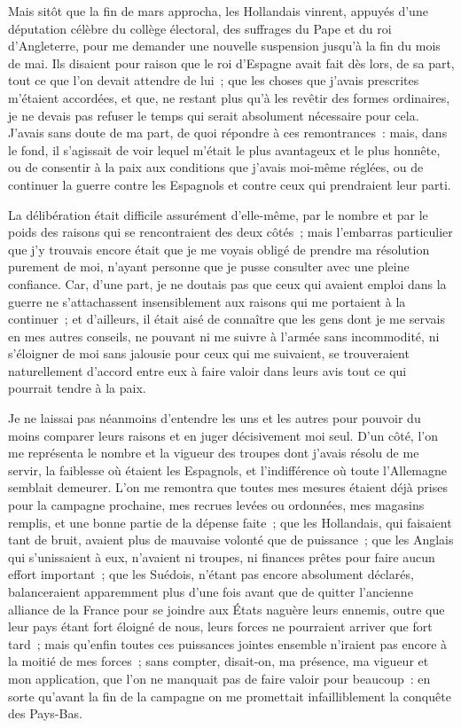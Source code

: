 \documentclass[french,twoside]{book} %
\begin{document}
Mais sitôt que la fin de mars approcha, les Hollandais vinrent, appuyés d’une députation célèbre du collège électoral, des suffrages du Pape et du roi d’Angleterre, pour me demander une nouvelle suspension jusqu’à la fin du mois de mai. Ils disaient pour raison que le roi d’Espagne avait fait dès lors, de sa part, tout ce que l’on devait attendre de lui ; que les choses que j’avais prescrites m’étaient accordées, et que, ne restant plus qu’à les revêtir des formes ordinaires, je ne devais pas refuser le temps qui serait absolument nécessaire pour cela. J’avais sans doute de ma part, de quoi répondre à ces remontrances : mais, dans le fond, il s’agissait de voir lequel m’était le plus avantageux et le plus honnête, ou de consentir à la paix aux conditions que j’avais moi-même réglées, ou de continuer la guerre contre les Espagnols et contre ceux qui prendraient leur parti.\par
La délibération était difficile assurément d’elle-même, par le nombre et par le poids des raisons qui se rencontraient des deux côtés ; mais l’embarras particulier que j’y trouvais encore était que je me voyais obligé de prendre ma résolution purement de moi, n’ayant personne que je pusse consulter avec une pleine confiance. Car, d’une part, je ne doutais pas que ceux qui avaient emploi dans la guerre ne s’attachassent insensiblement aux raisons qui me portaient à la continuer ; et d’ailleurs, il était aisé de connaître que les gens dont je me servais en mes autres conseils, ne pouvant ni me suivre à l’armée sans incommodité, ni s’éloigner de moi sans jalousie pour ceux qui me suivaient, se trouveraient naturellement d’accord entre eux à faire valoir dans leurs avis tout ce qui pourrait tendre à la paix.\par
Je ne laissai pas néanmoins d’entendre les uns et les autres pour pouvoir du moins comparer leurs raisons et en juger décisivement moi seul. D’un côté, l’on me représenta le nombre et la vigueur des troupes dont j’avais résolu de me servir, la faiblesse où étaient les Espagnols, et l’indifférence où toute l’Allemagne semblait demeurer. L’on me remontra que toutes mes mesures étaient déjà prises pour la campagne prochaine, mes recrues levées ou ordonnées, mes magasins remplis, et une bonne partie de la dépense faite ; que les Hollandais, qui faisaient tant de bruit, avaient plus de mauvaise volonté que de puissance ; que les Anglais qui s’unissaient à eux, n’avaient ni troupes, ni finances prêtes pour faire aucun effort important ; que les Suédois, n’étant pas encore absolument déclarés, balanceraient apparemment plus d’une fois avant que de quitter l’ancienne alliance de la France pour se joindre aux États naguère leurs ennemis, outre que leur pays étant fort éloigné de nous, leurs forces ne pourraient arriver que fort tard ; mais qu’enfin toutes ces puissances jointes ensemble n’iraient pas encore à la moitié de mes forces ; sans compter, disait-on, ma présence, ma vigueur et mon application, que l’on ne manquait pas de faire valoir pour beaucoup : en sorte qu’avant la fin de la campagne on me promettait infailliblement la conquête des Pays-Bas.\par
\end{document}
